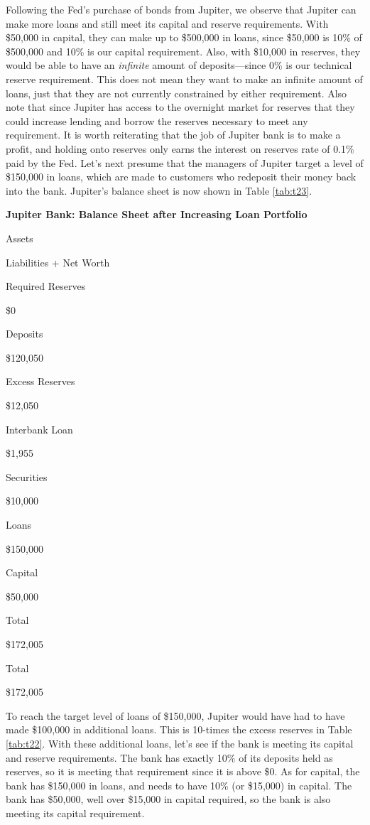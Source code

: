 \documentclass[
]{book}
\begin{document}
Following the Fed's purchase of bonds from Jupiter, we observe that Jupiter can make more loans and still meet its capital and reserve requirements. With \$50,000 in capital, they can make up to \$500,000 in loans, since \$50,000 is 10\% of \$500,000 and 10\% is our capital requirement. Also, with \$10,000 in reserves, they would be able to have an \emph{infinite} amount of deposits---since 0\% is our technical reserve requirement. This does not mean they want to make an infinite amount of loans, just that they are not currently constrained by either requirement. Also note that since Jupiter has access to the overnight market for reserves that they could increase lending and borrow the reserves necessary to meet any requirement. It is worth reiterating that the job of Jupiter bank is to make a profit, and holding onto reserves only earns the interest on reserves rate of 0.1\% paid by the Fed. Let's next presume that the managers of Jupiter target a level of \$150,000 in loans, which are made to customers who redeposit their money back into the bank. Jupiter's balance sheet is now shown in Table \ref{tab:t23}.

\label{tab:t23}\textbf{Jupiter Bank: Balance Sheet after Increasing Loan Portfolio}

Assets

Liabilities + Net Worth

Required Reserves

\$0

Deposits

\$120,050

Excess Reserves

\$12,050

Interbank Loan

\$1,955

Securities

\$10,000

Loans

\$150,000

Capital

\$50,000

Total

\$172,005

Total

\$172,005

To reach the target level of loans of \$150,000, Jupiter would have had to have made \$100,000 in additional loans. This is 10-times the excess reserves in Table \ref{tab:t22}. With these additional loans, let's see if the bank is meeting its capital and reserve requirements. The bank has exactly 10\% of its deposits held as reserves, so it is meeting that requirement since it is above \$0. As for capital, the bank has \$150,000 in loans, and needs to have 10\% (or \$15,000) in capital. The bank has \$50,000, well over \$15,000 in capital required, so the bank is also meeting its capital requirement.
\end{document}
